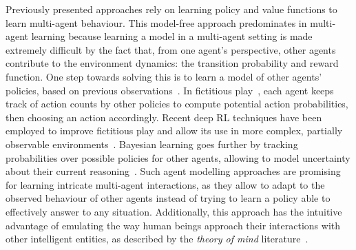 Previously presented approaches rely on learning policy and value functions to learn multi-agent behaviour. This model-free approach predominates in multi-agent learning because learning a model in a multi-agent setting is made extremely difficult by the fact that, from one agent's perspective, other agents contribute to the environment dynamics: the transition probability and reward function. 
One step towards solving this is to learn a model of other agents' policies, based on previous observations~\citep{Albrecht2018_AgentModellingReview}. 
In fictitious play~\citep{Brown1951_FictitiousPlay,Robinson1951_FictitiousPlay, Fudenberg1995_FictitiousPlay, Hofbauer2002_FictitiousPlay}, each agent keeps track of action counts by other policies to compute potential action probabilities, then choosing an action accordingly. Recent deep RL techniques have been employed to improve fictitious play and allow its use in more complex, partially observable environments~\citep{Heinrich2016_NSFP, Strouse2021_FCP, Papoudakis2021_LIAM, Rahman2023_GPL, Jing2024_OfflineOpponentModel}. 
Bayesian learning goes further by tracking probabilities over possible policies for other agents, allowing to model uncertainty about their current reasoning~\citep{Jordan1991_Bayesian, Kalai1993_Rational, Bowling2001_Rational, Foerster2019_BAD, Hu2020_SAD}. 
Such agent modelling approaches are promising for learning intricate multi-agent interactions, as they allow to adapt to the observed behaviour of other agents instead of trying to learn a policy able to effectively answer to any situation. Additionally, this approach has the intuitive advantage of emulating the way human beings approach their interactions with other intelligent entities, as described by the \textit{theory of mind} literature~\citep{Apperly2011_Mindreaders, Heyes2014_MindReading, Aru2023_DeepLearningToM}. 




